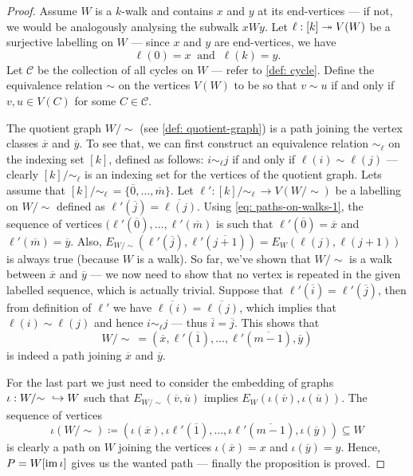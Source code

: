 \begin{proof}
Assume \(W\) is a \(k\)-walk and contains \(x\) and \(y\) at its end-vertices
--- if not, we would be analogously analysing the subwalk \(xWy\). Let \(\ell:
[k] \twoheadrightarrow V(W)\) be a surjective labelling on \(W\) --- since \(x\) and \(y\)
are end-vertices, we have
\begin{equation}\label{eq: paths-on-walks-1}
  \ell(0) = x\ \text{ and }\ \ell(k) = y.
\end{equation}
Let \(\mathcal C\) be the
collection of all cycles on \(W\) --- refer to \cref{def: cycle}. Define the
equivalence relation \(\sim\) on the vertices \(V(W)\) to be so that \(v \sim
u\) if and only if \(v, u \in V(C)\) for some \(C \in \mathcal C\).

The quotient graph \(W/{\sim}\) (see \cref{def: quotient-graph}) is a path joining
the vertex classes \(\overline x\) and \(\overline y\). To see that, we can
first construct an equivalence relation \(\sim_\ell\) on the indexing set \([k]\),
defined as follows: \(i \sim_\ell j\) if and only if \(\ell(i) \sim \ell(j)\) --- clearly
\([k]/{\sim_\ell}\) is an indexing set for the vertices of the quotient graph. Lets
assume that \([k]/{\sim_\ell}\, = \{\overline 0, \dots, \overline m\}\). Let \(\ell':
[k]/{\sim_\ell}\, \to V(W/{\sim})\) be a labelling on \(W/{\sim}\) defined as \(\ell'(\overline j) =
\overline{\ell(j)}\). Using \cref{eq: paths-on-walks-1}, the sequence of vertices
\((\ell'(\overline 0), \dots, \ell'(\overline m)\) is such that \(\ell'(\overline 0) =
\overline x\) and \(\ell'(\overline m) = \overline y\).  Also,
\(E_{W/{\sim}}(\ell'(\overline j), \ell'(\overline{j + 1})) = E_W(\ell(j), \ell(j+1))\) is always
true (because \(W\) is a walk). So far, we've shown that \(W/{\sim}\) is a walk
between \(\overline x\) and \(\overline y\) --- we now need to show that no vertex
is repeated in the given labelled sequence, which is actually trivial. Suppose
that \(\ell'(\overline i) = \ell'(\overline j)\), then from definition of \(\ell'\) we
have \(\overline{\ell(i)} = \overline{\ell(j)}\), which implies that \(\ell(i) \sim \ell(j)\)
and hence \(i \sim_\ell j\) --- thus \(\overline i = \overline j\). This shows that
\[
  W/{\sim}\ = (\overline x, \ell'(\overline 1), \dots, \ell'(\overline{m - 1}),
  \overline y)
\]
is indeed a path joining \(\overline x\) and \(\overline y\).

For the last part we just need to consider the embedding of graphs \(\iota: W/{\sim}\
\hookrightarrow W\) such that \(E_{W/{\sim}}(\overline v, \overline u)\) implies
\(E_W(\iota(\overline v), \iota(\overline u))\). The sequence of vertices
\[
  \iota(W/{\sim}) \coloneqq (\iota(\overline x), \iota\ell'(\overline 1), \dots,
  \iota \ell'(\overline{m-1}), \iota(\overline y)) \subseteq W
\]
is clearly a path on \(W\) joining the vertices \(\iota(\overline x) = x\) and
\(\iota(\overline y) = y\). Hence, \(P = W[\operatorname{im} \iota]\) gives us the wanted
path --- finally the proposition is proved.
\end{proof}

